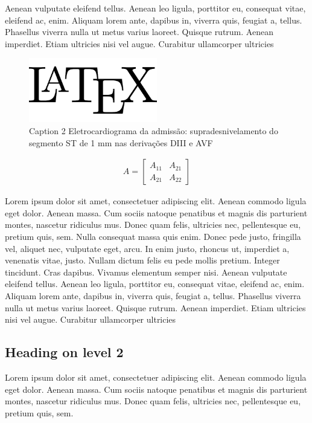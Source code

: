 Aenean vulputate eleifend tellus. Aenean leo ligula, porttitor eu, consequat
vitae, eleifend ac, enim. Aliquam lorem ante, dapibus in, viverra quis, feugiat
a, tellus. Phasellus viverra nulla ut metus varius laoreet. Quisque rutrum.
Aenean imperdiet. Etiam ultricies nisi vel augue. Curabitur ullamcorper
ultricies 

\begin{figure}[h]
	\centering
	\includegraphics[width=0.5\textwidth]{temp.png}
	\caption{Caption 2 Eletrocardiograma da admissão: supradesnivelamento do segmento ST de 1 mm nas derivações DIII e AVF}
	\label{Figura 2}
\end{figure}

\begin{align}
	A = 
	\begin{bmatrix}
	A_{11} & A_{21} \\
  	A_{21} & A_{22}
	\end{bmatrix}
\end{align}

Lorem ipsum dolor sit amet, consectetuer adipiscing elit. Aenean commodo ligula
eget dolor. Aenean massa. Cum sociis natoque penatibus et magnis dis parturient
montes, nascetur ridiculus mus. Donec quam felis, ultricies nec, pellentesque
eu, pretium quis, sem. Nulla consequat massa quis enim. Donec pede justo,
fringilla vel, aliquet nec, vulputate eget, arcu. In enim justo, rhoncus ut,
imperdiet a, venenatis vitae, justo. Nullam dictum felis eu pede mollis
pretium. Integer tincidunt. Cras dapibus. Vivamus elementum semper nisi. Aenean
vulputate eleifend tellus. Aenean leo ligula, porttitor eu, consequat vitae,
eleifend ac, enim. Aliquam lorem ante, dapibus in, viverra quis, feugiat a,
tellus. Phasellus viverra nulla ut metus varius laoreet. Quisque rutrum. Aenean
imperdiet. Etiam ultricies nisi vel augue. Curabitur ullamcorper ultricies 

\subsection*{Heading on level 2}

Lorem ipsum dolor sit amet, consectetuer adipiscing elit. Aenean commodo ligula
eget dolor. Aenean massa. Cum sociis natoque penatibus et magnis dis parturient
montes, nascetur ridiculus mus. Donec quam felis, ultricies nec, pellentesque
eu, pretium quis, sem. 

